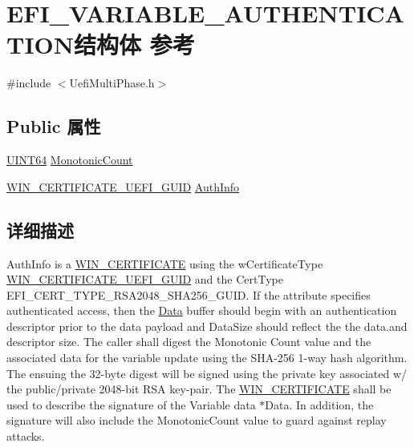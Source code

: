 \hypertarget{struct_e_f_i___v_a_r_i_a_b_l_e___a_u_t_h_e_n_t_i_c_a_t_i_o_n}{}\section{E\+F\+I\+\_\+\+V\+A\+R\+I\+A\+B\+L\+E\+\_\+\+A\+U\+T\+H\+E\+N\+T\+I\+C\+A\+T\+I\+O\+N结构体 参考}
\label{struct_e_f_i___v_a_r_i_a_b_l_e___a_u_t_h_e_n_t_i_c_a_t_i_o_n}


{\ttfamily \#include $<$Uefi\+Multi\+Phase.\+h$>$}

\subsection*{Public 属性}
\begin{DoxyCompactItemize}
\item 
\hyperlink{_processor_bind_8h_a57be03562867144161c1bfee95ca8f7c}{U\+I\+N\+T64} \hyperlink{struct_e_f_i___v_a_r_i_a_b_l_e___a_u_t_h_e_n_t_i_c_a_t_i_o_n_afc0e2555963a8a3046a17ddd2c09350e}{Monotonic\+Count}
\item 
\hyperlink{struct_w_i_n___c_e_r_t_i_f_i_c_a_t_e___u_e_f_i___g_u_i_d}{W\+I\+N\+\_\+\+C\+E\+R\+T\+I\+F\+I\+C\+A\+T\+E\+\_\+\+U\+E\+F\+I\+\_\+\+G\+U\+ID} \hyperlink{struct_e_f_i___v_a_r_i_a_b_l_e___a_u_t_h_e_n_t_i_c_a_t_i_o_n_a69728a7870afdec21157504b489a6e1b}{Auth\+Info}
\end{DoxyCompactItemize}


\subsection{详细描述}
Auth\+Info is a \hyperlink{struct_w_i_n___c_e_r_t_i_f_i_c_a_t_e}{W\+I\+N\+\_\+\+C\+E\+R\+T\+I\+F\+I\+C\+A\+TE} using the w\+Certificate\+Type \hyperlink{struct_w_i_n___c_e_r_t_i_f_i_c_a_t_e___u_e_f_i___g_u_i_d}{W\+I\+N\+\_\+\+C\+E\+R\+T\+I\+F\+I\+C\+A\+T\+E\+\_\+\+U\+E\+F\+I\+\_\+\+G\+U\+ID} and the Cert\+Type E\+F\+I\+\_\+\+C\+E\+R\+T\+\_\+\+T\+Y\+P\+E\+\_\+\+R\+S\+A2048\+\_\+\+S\+H\+A256\+\_\+\+G\+U\+ID. If the attribute specifies authenticated access, then the \hyperlink{struct_data}{Data} buffer should begin with an authentication descriptor prior to the data payload and Data\+Size should reflect the the data.\+and descriptor size. The caller shall digest the Monotonic Count value and the associated data for the variable update using the S\+H\+A-\/256 1-\/way hash algorithm. The ensuing the 32-\/byte digest will be signed using the private key associated w/ the public/private 2048-\/bit R\+SA key-\/pair. The \hyperlink{struct_w_i_n___c_e_r_t_i_f_i_c_a_t_e}{W\+I\+N\+\_\+\+C\+E\+R\+T\+I\+F\+I\+C\+A\+TE} shall be used to describe the signature of the Variable data $\ast$\+Data. In addition, the signature will also include the Monotonic\+Count value to guard against replay attacks. 


